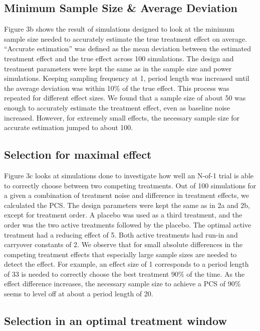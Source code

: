\documentclass[11pt,]{article}
\begin{document}
\subsection{Minimum Sample Size \& Average
Deviation}\label{minimum-sample-size-average-deviation}

Figure 3b shows the result of simulations designed to look at the
minimum sample size needed to accurately estimate the true treatment
effect on average. ``Accurate estimation'' was defined as the mean
deviation between the estimated treatment effect and the true effect
across 100 simulations. The design and treatment parameters were kept
the same as in the sample size and power simulations. Keeping sampling
frequency at 1, period length was increased until the average deviation
was within 10\% of the true effect. This process was repeated for
different effect sizes. We found that a sample size of about 50 was
enough to accurately estimate the treatment effect, even as baseline
noise increased. However, for extremely small effects, the necessary
sample size for accurate estimation jumped to about 100.

\subsection{Selection for maximal
effect}\label{selection-for-maximal-effect}

Figure 3c looks at simulations done to investigate how well an N-of-1
trial is able to correctly choose between two competing treatments. Out
of 100 simulations for a given a combination of treatment noise and
difference in treatment effects, we calculated the PCS. The design
parameters were kept the same as in 2a and 2b, except for treatment
order. A placebo was used as a third treatment, and the order was the
two active treatments followed by the placebo. The optimal active
treatment had a reducing effect of 5. Both active treatments had run-in
and carryover constants of 2. We observe that for small absolute
differences in the competing treatment effects that especially large
sample sizes are needed to detect the effect. For example, an effect
size of 1 corresponds to a period length of 33 is needed to correctly
choose the best treatment 90\% of the time. As the effect difference
increases, the necessary sample size to achieve a PCS of 90\% seems to
level off at about a period length of 20.

\subsection{Selection in an optimal treatment
window}\label{selection-in-an-optimal-treatment-window}
\end{document}
